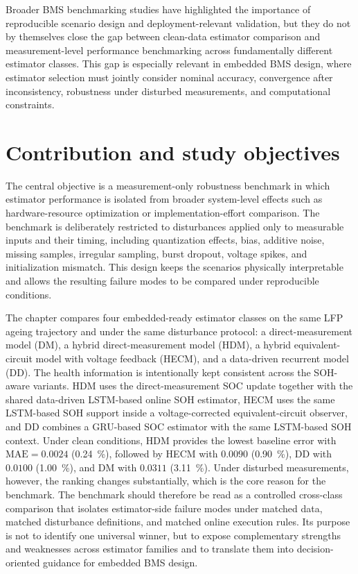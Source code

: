 \documentclass[
    a4paper,
    12pt,
    titlepage,
    bibliography=totoc,
    twoside=on,
    parskip=false,
    numbers=noenddot,
    cleardoublepage=empty,
    DIV=12,
    BCOR=12.0mm,
    headheight=36pt,
    headings=openright
]{scrreprt}
\begin{document}
Broader BMS benchmarking studies have highlighted the importance of reproducible scenario design and deployment-relevant validation, but they do not by themselves close the gap between clean-data estimator comparison and measurement-level performance benchmarking across fundamentally different estimator classes.\autocite{bergerBenchmarkingBatteryManagement2024} This gap is especially relevant in embedded BMS design, where estimator selection must jointly consider nominal accuracy, convergence after inconsistency, robustness under disturbed measurements, and computational constraints.

\section{Contribution and study objectives}
The central objective is a measurement-only robustness benchmark in which estimator performance is isolated from broader system-level effects such as hardware-resource optimization or implementation-effort comparison. The benchmark is deliberately restricted to disturbances applied only to measurable inputs and their timing, including quantization effects, bias, additive noise, missing samples, irregular sampling, burst dropout, voltage spikes, and initialization mismatch. This design keeps the scenarios physically interpretable and allows the resulting failure modes to be compared under reproducible conditions.

The chapter compares four embedded-ready estimator classes on the same LFP ageing trajectory and under the same disturbance protocol: a direct-measurement model (DM), a hybrid direct-measurement model (HDM), a hybrid equivalent-circuit model with voltage feedback (HECM), and a data-driven recurrent model (DD). The health information is intentionally kept consistent across the SOH-aware variants. HDM uses the direct-measurement SOC update together with the shared data-driven LSTM-based online SOH estimator, HECM uses the same LSTM-based SOH support inside a voltage-corrected equivalent-circuit observer, and DD combines a GRU-based SOC estimator with the same LSTM-based SOH context. Under clean conditions, HDM provides the lowest baseline error with $\mathrm{MAE}=0.0024$ (\SI{0.24}{\percent}), followed by HECM with $0.0090$ (\SI{0.90}{\percent}), DD with $0.0100$ (\SI{1.00}{\percent}), and DM with $0.0311$ (\SI{3.11}{\percent}). Under disturbed measurements, however, the ranking changes substantially, which is the core reason for the benchmark. The benchmark should therefore be read as a controlled cross-class comparison that isolates estimator-side failure modes under matched data, matched disturbance definitions, and matched online execution rules. Its purpose is not to identify one universal winner, but to expose complementary strengths and weaknesses across estimator families and to translate them into decision-oriented guidance for embedded BMS design.
\end{document}
